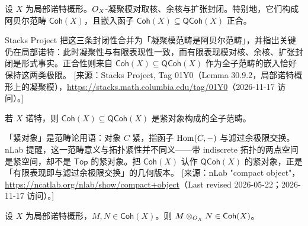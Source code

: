 \begin{corollary}\label{cor:22.4.4}
设 $X$ 为局部诺特概形。$O_X$-凝聚模对取核、余核与扩张封闭。特别地，它们构成阿贝尔范畴 $\mathsf{Coh}(X)$，且嵌入函子 $\mathsf{Coh}(X) \subseteq \mathsf{QCoh}(X)$ 正合。
\end{corollary}

\begin{yizhu}
Stacks Project 把这三条封闭性合并为「凝聚模范畴是阿贝尔范畴」，并指出关键仍在局部诺特：此时凝聚性与有限表现性一致，而有限表现模对核、余核、扩张封闭是形式事实。正合性则来自 $\mathsf{Coh}(X) \subseteq \mathsf{QCoh}(X)$ 作为全子范畴的嵌入恰好保持这两类极限。
[来源：Stacks Project, Tag 01Y0（Lemma 30.9.2，局部诺特概形上的凝聚模），\url{https://stacks.math.columbia.edu/tag/01Y0}（2026-11-17 访问）。]
\end{yizhu}

\begin{remark}\label{rem:22.4.5}
若 $X$ 诺特，则 $\mathsf{Coh}(X) \subseteq \mathsf{QCoh}(X)$ 是紧对象构成的全子范畴。
\end{remark}

\begin{yizhu}
「紧对象」是范畴论用语：对象 $C$ 紧，指函子 $\operatorname{Hom}(C, -)$ 与滤过余极限交换。nLab 提醒，这一范畴意义与拓扑紧性并不同义——带 indiscrete 拓扑的两点空间是紧空间，却不是 $\mathsf{Top}$ 的紧对象。把 $\mathsf{Coh}(X)$ 认作 $\mathsf{QCoh}(X)$ 的紧对象，正是「有限表现即与滤过余极限交换」的几何版本。
[来源：nLab "compact object"，\url{https://ncatlab.org/nlab/show/compact+object}（Last revised 2026-05-22；2026-11-17 访问）。]
\end{yizhu}

\begin{exercise}\label{exc:22.4.6}
设 $X$ 为局部诺特概形，$M, N \in \mathsf{Coh}(X)$。则 $M \otimes_{O_X} N \in \mathsf{Coh}(X)$。
\end{exercise}
